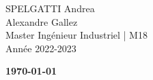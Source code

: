 \begin{titlepage}
\begin{center}
		\end{center}
		\vspace{2 cm}
		\begin{minipage}{0.75\textwidth}
			\begin{flushleft}
				SPELGATTI Andrea \\
				Alexandre Gallez \\
				Master Ingénieur Industriel | M18\\
				Année 2022-2023
			\end{flushleft}
		\end{minipage}
		\vspace{3cm}
		\begin{center}
			{\bfseries \today}
		\end{center}
\end{titlepage}